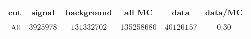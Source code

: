 \begin{tabular}{r|c|c|c|c|c}
cut&signal&background&all MC&data&data/MC\\
\hline
All&$3925978$&$131332702$&$135258680$&$40126157$&$0.30$\\
\end{tabular}

